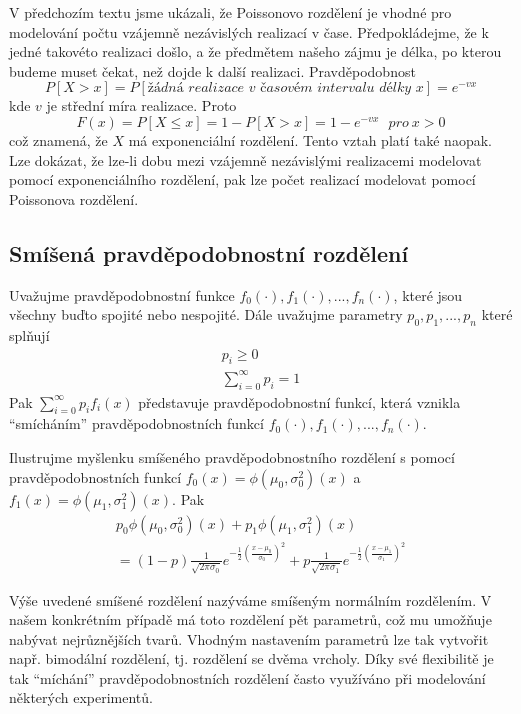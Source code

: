 V předchozím textu jsme ukázali, že Poissonovo rozdělení je vhodné pro modelování počtu vzájemně nezávislých realizací v čase. Předpokládejme, že k jedné takovéto realizaci došlo, a že předmětem našeho zájmu je délka, po kterou budeme muset čekat, než dojde k další realizaci. Pravděpodobnost
\begin{equation*}
P[X > x] = P[\textit{žádná realizace v časovém intervalu délky x}] = e^{-vx}
\end{equation*}
kde $v$ je střední míra realizace. Proto
\begin{equation*}
F(x) = P[X \le x] = 1 - P[X > x] = 1 - e^{-vx} ~~~\textit{pro}~x > 0
\end{equation*}
což znamená, že $X$ má exponenciální rozdělení. Tento vztah platí také naopak. Lze dokázat, že lze-li dobu mezi vzájemně nezávislými realizacemi modelovat pomocí exponenciálního rozdělení, pak lze počet realizací modelovat pomocí Poissonova rozdělení.

\subsection{Smíšená pravděpodobnostní rozdělení}

Uvažujme pravděpodobnostní funkce $f_0(\cdot), f_1(\cdot), ..., f_n(\cdot)$, které jsou všechny buďto spojité nebo nespojité. Dále uvažujme parametry $p_0, p_1, ..., p_n$ které splňují
\begin{gather*}
p_i \ge 0\\
\sum_{i = 0}^{\infty}p_i = 1
\end{gather*}
Pak $\sum_{i = 0}^{\infty}p_i f_i(x)$ představuje pravděpodobnostní funkcí, která vznikla ``smícháním'' pravděpodobnostních funkcí $f_0(\cdot), f_1(\cdot), ..., f_n(\cdot)$.

\begin{example}
Ilustrujme myšlenku smíšeného pravděpodobnostního rozdělení s pomocí pravděpodobnostních funkcí $f_0(x) = \phi(\mu_0, \sigma_0^2)(x)$ a $f_1(x) = \phi(\mu_1, \sigma_1^2)(x)$. Pak
\begin{gather*}
p_0 \phi(\mu_0, \sigma_0^2)(x) + p_1 \phi(\mu_1, \sigma_1^2)(x)\\
= (1 - p) \frac{1}{\sqrt{2 \pi \sigma_0}}e^{-\frac{1}{2}(\frac{x - \mu_0}{\sigma_0})^2} + p \frac{1}{\sqrt{2 \pi \sigma_1}}e^{-\frac{1}{2}(\frac{x - \mu_1}{\sigma_1})^2}
\end{gather*}
\end{example}

Výše uvedené smíšené rozdělení nazýváme smíšeným normálním rozdělením. V našem konkrétním případě má toto rozdělení pět parametrů, což mu umožňuje nabývat nejrůznějších tvarů. Vhodným nastavením parametrů lze tak vytvořit např. bimodální rozdělení, tj. rozdělení se dvěma vrcholy. Díky své flexibilitě je tak ``míchání'' pravděpodobnostních rozdělení často využíváno při modelování některých experimentů.

